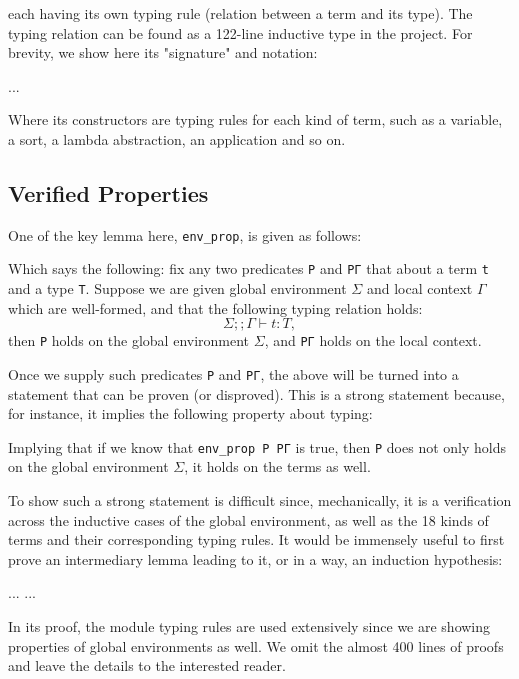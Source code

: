 each having its own typing rule (relation between a term and its type). The
typing relation can be found as a 122-line inductive type in the project. For
brevity, we show here its "signature" and notation:

...

Where its constructors are typing rules for each kind of term, such as a
variable, a sort, a lambda abstraction, an application and so on.

\subsection*{Verified Properties}

One of the key lemma here, \verb|env_prop|, is given as follows:


Which says the following: fix any two predicates \verb|P| and \verb|PΓ| that
about a term \verb|t| and a type \verb|T|. Suppose we are given global
environment $\Sigma$ and local context $\Gamma$ which are well-formed, and that
the following typing relation holds:
\[\Sigma ;; \Gamma \vdash t:T,\]
then \verb|P| holds on the global environment $\Sigma$, and \verb|PΓ| holds on
the local context.

Once we supply such predicates \verb|P| and \verb|PΓ|, the above will be turned
into a statement that can be proven (or disproved). This is a strong statement
because, for instance, it implies the following property about typing:


Implying that if we know that \verb|env_prop P PΓ| is true, then \verb|P| does
not only holds on the global environment $\Sigma$, it holds on the terms as
well.

To show such a strong statement is difficult since, mechanically, it is a
verification across the inductive cases of the global environment, as well as
the 18 kinds of terms and their corresponding typing rules. It would be
immensely useful to first prove an intermediary lemma leading to it, or in a
way, an induction hypothesis:

...
...

In its proof, the module typing rules are used extensively since we are showing
properties of global environments as well. We omit the almost 400 lines of
proofs and leave the details to the interested reader.



